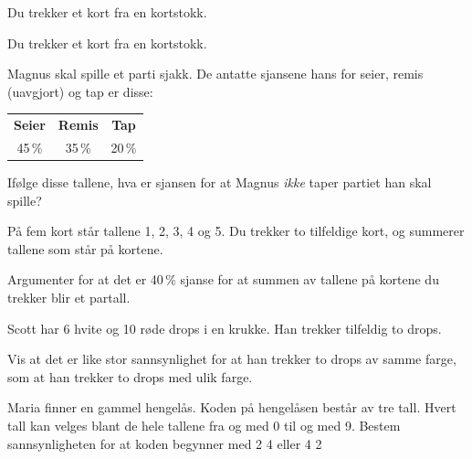 




\opgt

\nes 

Du trekker et kort fra en kortstokk.\os
{}

Du trekker et kort fra en kortstokk.\os
{}

Magnus skal spille et parti sjakk. De antatte sjansene hans for seier, remis (uavgjort) og tap er disse:
\begin{center}
	\begin{tabular}{|c|c|c|}
		\textbf{Seier} & \textbf{Remis} & \textbf{Tap} \\
		45\,\% & 35\,\% & 20\,\%
	\end{tabular}
\end{center}
Ifølge disse tallene, hva er sjansen for at Magnus \textsl{ikke} taper partiet han skal spille?

På fem kort står tallene 1, 2, 3, 4 og 5. Du trekker to tilfeldige kort, og summerer tallene som står på kortene. \os

Argumenter for at det er 40\,\% sjanse for at summen av tallene på kortene du trekker blir et
partall.

Scott har 6 hvite og 10 røde drops i en krukke.
Han trekker tilfeldig to drops.\os

Vis at det er like stor sannsynlighet for at han
trekker to drops av samme farge, som at han trekker to drops med ulik farge.

Maria finner en gammel hengelås. Koden på hengelåsen består av tre tall. Hvert tall
kan velges blant de hele tallene fra og med 0 til og med 9. \os
Bestem sannsynligheten for at koden begynner med 2 4 eller 4 2

